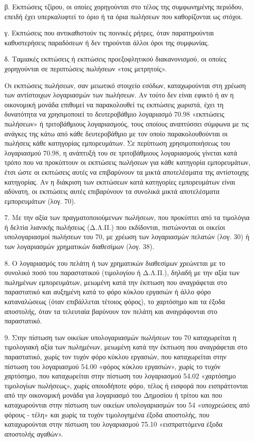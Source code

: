 \documentclass[A4,10pt,greek]{book}
\begin{document}
β. Εκπτώσεις τζίρου, οι οποίες χορηγούνται στο τέλος της συμφωνημένης περιόδου, επειδή έχει υπερκαλυφτεί το όριο ή τα όρια πωλήσεων που καθορίζονται ως στόχοι.

γ. Εκπτώσεις που αντικαθιστούν τις ποινικές ρήτρες, όταν παρατηρούνται καθυστερήσεις παραδόσεων ή δεν τηρούνται άλλοι όροι της συμφωνίας.

δ. Ταμιακές εκπτώσεις ή εκπτώσεις προεξοφλητικού διακανονισμού, οι οποίες χορηγούνται σε περιπτώσεις πωλήσεων «τοις μετρητοίς».

Οι εκπτώσεις πωλήσεων, σαν μειωτικό στοιχείο εσόδων, καταχωρούνται στη χρέωση των αντίστοιχων λογαριασμών των πωλήσεων. Αν τούτο δεν είναι εφικτό ή αν η οικονομική μονάδα επιθυμεί να παρακολουθεί τις εκπτώσεις χωριστά, έχει τη δυνατότητα να χρησιμοποιεί το δευτεροβάθμιο λογαριασμό 70.98 «εκπτώσεις πωλήσεων» ή τριτοβάθμιους λογαριασμούς, τους οποίους αναπτύσσει σύμφωνα με τις ανάγκες της κάτω από κάθε δευτεροβάθμιο με τον οποίο παρακολουθούνται οι πωλήσεις κάθε κατηγορίας εμπορευμάτων. Σε περίπτωση χρησιμοποιήσεως του λογαριασμού 70.98, η ανάπτυξή του σε τριτοβάθμιους λογαριασμούς γίνεται κατά τρόπο που να προκύπτουν οι εκπτώσεις πωλήσεων για κάθε κατηγορία εμπορευμάτων, έτσι ώστε οι εκπτώσεις αυτές να επιβαρύνουν τα μικτά αποτελέσματα της αντίστοιχης κατηγορίας. Αν η διάκριση των εκπτώσεων κατά κατηγορίες εμπορευμάτων είναι αδύνατη, οι εκπτώσεις αυτές επιβαρύνουν τα συνολικά μικτά αποτελέσματα εμπορευμάτων (λογ. 70).

7. Με την αξία των πραγματοποιούμενων πωλήσεων, που προκύπτει από τα τιμολόγια ή δελτία λιανικής πωλήσεως (Δ.Λ.Π.) που εκδίδονται, πιστώνονται οι οικείοι υπολογαριασμοί πωλήσεων του 70, με χρέωση των λογαριασμών πελατών (λογ. 30) ή των λογαριασμών χρηματικών διαθεσίμων (λογ. 38).

8. Ο λογαριασμός του πελάτη ή των χρηματικών διαθεσίμων χρεώνεται με το συνολικό ποσό του παραστατικού (τιμολογίου ή Δ.Λ.Π.), δηλαδή με την αξία των πωλημένων εμπορευμάτων, μειωμένη κατά την έκπτωση που αναγράφεται στο παραστατικό και αυξημένη κατά το φόρο κύκλου εργασιών ή άλλο φόρο καταναλώσεως (όταν επιβάλλεται τέτοιος φόρος), το χαρτόσημο και τα έξοδα αποστολής, όταν τα τελευταία βαρύνουν τον πελάτη και αναγράφονται στο παραστατικό.

9. Στην πίστωση των οικείων υπολογαριασμών πωλήσεων του 70 καταχωρείται η τιμολογιακή αξία των πωλημένων, μειωμένη κατά την έκπτωση που αναγράφεται στο παραστατικό, χωρίς τον τυχόν φόρο κύκλου εργασιών, που καταχωρείται στην πίστωση του λογαριασμού 54.00 «φόρος κύκλου εργασιών», χωρίς το τυχόν χαρτόσημο, που καταχωρείται στην πίστωση του λογαριασμού 54.02 «χαρτόσημο τιμολογίων πωλήσεως», χωρίς οποιοδήποτε φόρο, τέλος ή εισφορά που εισπράττονται από την οικονομική μονάδα για λογαριασμό του Δημοσίου ή τρίτου και που καταχωρούνται στην πίστωση των οικείων υπολογαριασμών του 54 «υποχρεώσεις από φόρους - τέλη» και χωρίς τα τυχόν τιμολογημένα έξοδα αποστολής, που καταχωρούνται στην πίστωση του λογαριασμού 75.10 «εισπραττόμενα έξοδα αποστολής αγαθών».
\end{document}
